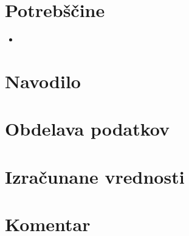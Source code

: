 \documentclass[12pt]{report}
\begin{document}
\begingroup
\let\clearpage\relax

\chapter*{Potrebščine}
\begin{itemize}
\item 
\end{itemize}

\chapter*{Navodilo}

\endgroup


\chapter*{Obdelava podatkov}



\chapter*{Izračunane vrednosti}


\chapter*{Komentar}
\end{document}
